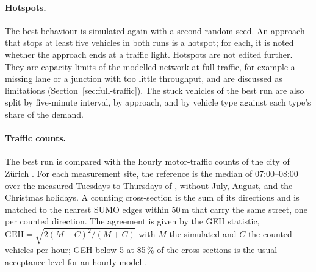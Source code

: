 \paragraph{Hotspots.} The best behaviour is simulated again with a
second random seed. An approach that stops at least five vehicles in
both runs is a hotspot; for each, it is noted whether the approach ends
at a traffic light. Hotspots are not edited further. They are capacity
limits of the modelled network at full traffic, for example a missing
lane or a junction with too little throughput, and are discussed as
limitations (Section~\ref{sec:full-traffic}). The stuck vehicles of
the best run are also split by five-minute interval, by approach, and
by vehicle type against each type's share of the demand.

\paragraph{Traffic counts.} The best run is compared with the hourly
motor-traffic counts of the city of Zürich \citep{zurichcounts}. For
each measurement site, the reference is the median of 07:00--08:00
over the measured Tuesdays to Thursdays of , without July,
August, and the Christmas holidays. A counting cross-section is the sum
of its directions and is matched to the nearest SUMO edges within
\(50\,\mathrm{m}\) that carry the same street, one per counted
direction. The agreement is given by the GEH statistic,
\(\mathrm{GEH} = \sqrt{2(M-C)^2/(M+C)}\) with \(M\) the simulated and
\(C\) the counted vehicles per hour; GEH below 5 at 85\,\% of the
cross-sections is the usual acceptance level for an hourly model
\citep{dmrb1996}.

